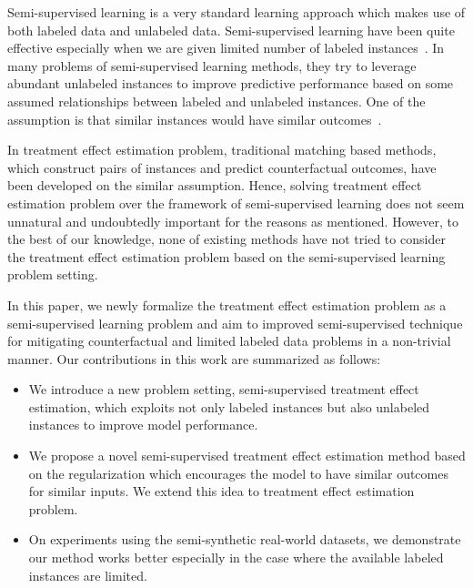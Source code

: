 
 Semi-supervised learning is a very standard learning approach which makes use of both labeled data and unlabeled data. Semi-supervised learning have been quite effective especially when we are given limited number of labeled instances~\cite{bengio2007greedy,hinton2006fast}. 
 In many problems of semi-supervised learning methods, they try to leverage abundant unlabeled instances to improve predictive performance based on some assumed relationships between labeled and unlabeled instances. One of the assumption is that similar instances would have similar outcomes~\cite{zhu2002learning,belkin2006manifold,kipf2016semi}. 
 
 In treatment effect estimation problem, traditional matching based methods, which construct pairs of instances and predict counterfactual outcomes, have been developed on the similar assumption. Hence, solving treatment effect estimation problem over the framework of semi-supervised learning does not seem unnatural and undoubtedly important for the reasons as mentioned.  However, to the best of our knowledge, none of existing methods have not tried to consider the treatment effect estimation problem based on the semi-supervised learning problem setting. 

In this paper, we newly formalize the treatment effect estimation problem as a semi-supervised learning problem and aim to improved semi-supervised technique for mitigating counterfactual and limited labeled data problems  in a non-trivial manner. Our contributions in this work are summarized as follows:
\begin{itemize}
\item We introduce a new problem setting, semi-supervised treatment effect estimation, which exploits not only labeled instances but also unlabeled instances to improve model performance.
\item We propose a novel semi-supervised treatment effect estimation method based on the regularization which encourages the model to have similar outcomes for similar inputs. We extend this idea to treatment effect estimation problem.
\item On experiments using the semi-synthetic real-world datasets, we demonstrate our method works better especially in the case where the available labeled instances are limited.
\end{itemize}


\fi
